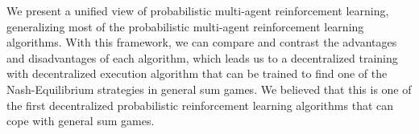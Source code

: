 We present a unified view of probabilistic multi-agent reinforcement learning, generalizing most of the probabilistic multi-agent reinforcement learning algorithms. With this framework, we can compare and contrast the advantages and disadvantages of each algorithm, which leads us to a decentralized training with decentralized execution algorithm that can be trained to find one of the Nash-Equilibrium strategies in general sum games. We believed that this is one of the first decentralized probabilistic reinforcement learning algorithms that can cope with general sum games. 